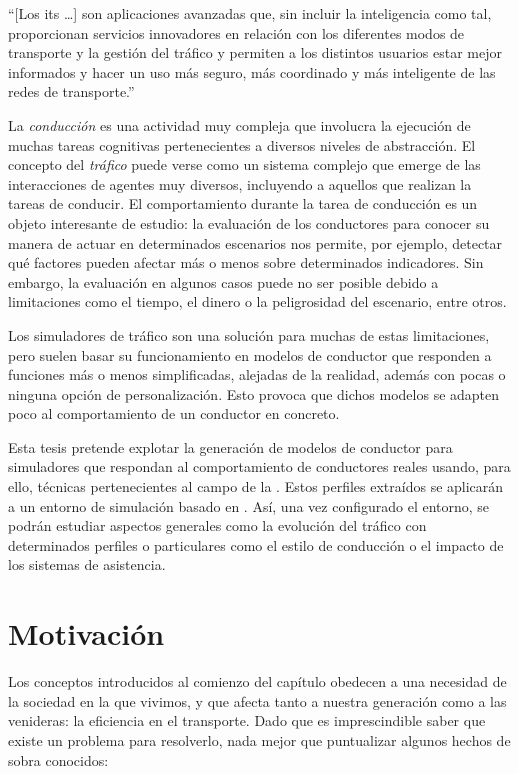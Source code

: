 \enquote{[Los \acrshort{its} \ldots] son aplicaciones avanzadas que, sin incluir la inteligencia como tal, proporcionan servicios innovadores en relación con los diferentes modos de transporte y la gestión del tráfico y permiten a los distintos usuarios estar mejor informados y hacer un uso más seguro, más coordinado y más inteligente de las redes de transporte.}

La \textit{conducción} es una actividad muy compleja que involucra la ejecución de muchas tareas cognitivas pertenecientes a diversos niveles de abstracción. El concepto del \textit{tráfico} puede verse como un sistema complejo que emerge de las interacciones de agentes muy diversos, incluyendo a aquellos que realizan la tareas de conducir. El comportamiento durante la tarea de conducción es un objeto interesante de estudio: la evaluación de los conductores para conocer su manera de actuar en determinados escenarios nos permite, por ejemplo, detectar qué factores pueden afectar más o menos sobre determinados indicadores. Sin embargo, la evaluación en algunos casos puede no ser posible debido a limitaciones como el tiempo, el dinero o la peligrosidad del escenario, entre otros.

Los simuladores de tráfico son una solución para muchas de estas limitaciones, pero suelen basar su funcionamiento en modelos de conductor que responden a funciones más o menos simplificadas, alejadas de la realidad, además con pocas o ninguna opción de personalización. Esto provoca que dichos modelos se adapten poco al comportamiento de un conductor en concreto.

Esta tesis pretende explotar la generación de modelos de conductor para simuladores que respondan al comportamiento de conductores reales usando, para ello, técnicas pertenecientes al campo de la . Estos perfiles extraídos se aplicarán a un entorno de simulación basado en . Así, una vez configurado el entorno, se podrán estudiar aspectos generales como la evolución del tráfico con determinados perfiles o particulares como el estilo de conducción o el impacto de los sistemas de asistencia.

\section{Motivación}

Los conceptos introducidos al comienzo del capítulo obedecen a una necesidad de la sociedad en la que vivimos, y que afecta tanto a nuestra generación como a las venideras: la eficiencia en el transporte. Dado que es imprescindible saber que existe un problema para resolverlo, nada mejor que puntualizar algunos hechos de sobra conocidos:


